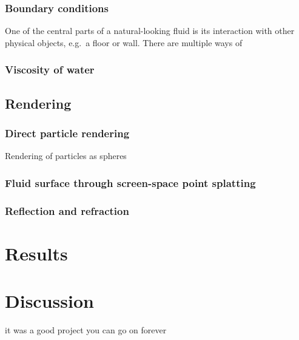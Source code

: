 \documentclass[paper=a4, fontsize=11pt]{report}
\numberwithin{equation}{section} %
\numberwithin{figure}{section} %
\numberwithin{table}{section} %
\begin{document}
\subsection{Boundary conditions}
One of the central parts of a natural-looking fluid is its interaction with other physical objects, e.g.\ a floor or wall. There are multiple ways of 

\subsection{Viscosity of water}

\section{Rendering}
\subsection{Direct particle rendering}
Rendering of particles as spheres

\subsection{Fluid surface through screen-space point splatting}
\subsection{Reflection and refraction}

\chapter{Results}

\chapter{Discussion}
it was a good project you can go on forever
\end{document}
